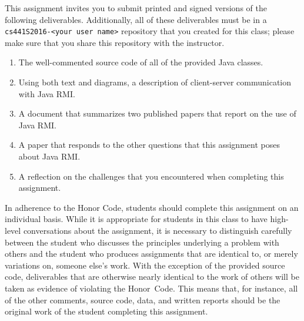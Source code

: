 This assignment invites you to submit printed and signed versions of the following deliverables. Additionally,
all of these deliverables must be in a {\tt cs441S2016-<your user name>} repository that you created for this class;
please make sure that you share this repository with the instructor.

\vspace*{-.1in}

\begin{enumerate}
  \itemsep 0em

  \item The well-commented source code of all of the provided Java classes.

  \item Using both text and diagrams, a description of client-server communication with Java RMI.

  \item A document that summarizes two published papers that report on the use of Java RMI.

  \item A paper that responds to the other questions that this assignment poses about Java RMI.

  \item A reflection on the challenges that you encountered when completing this assignment.

\end{enumerate}

\vspace*{-.1in}


In adherence to the Honor Code, students should complete this assignment on an individual basis. While it is appropriate
for students in this class to have high-level conversations about the assignment, it is necessary to distinguish
carefully between the student who discusses the principles underlying a problem with others and the student who produces
assignments that are identical to, or merely variations on, someone else's work.  With the exception of the provided
source code, deliverables that are otherwise nearly identical to the work of others will be taken as evidence of
violating the \mbox{Honor Code}. This means that, for instance, all of the other comments, source code, data, and
written reports should be the original work of the student completing this assignment.



